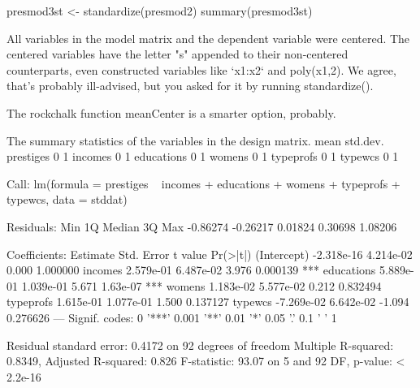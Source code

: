 \begin{Schunk}
\begin{Sinput}
 presmod3st <- standardize(presmod2)
 summary(presmod3st)
\end{Sinput}
\begin{Soutput}
All variables in the model matrix and the dependent variable
were centered. The centered variables have the letter "s" appended to their
non-centered counterparts, even constructed
variables like `x1:x2` and poly(x1,2). We agree, that's probably
ill-advised, but you asked for it by running standardize().

The rockchalk function meanCenter is a smarter option, probably. 

The summary statistics of the variables in the design matrix. 
           mean std.dev.
prestiges     0        1
incomes       0        1
educations    0        1
womens        0        1
typeprofs     0        1
typewcs       0        1

Call:
lm(formula = prestiges ~ incomes + educations + womens + typeprofs + 
    typewcs, data = stddat)

Residuals:
     Min       1Q   Median       3Q      Max 
-0.86274 -0.26217  0.01824  0.30698  1.08206 

Coefficients:
              Estimate Std. Error t value Pr(>|t|)    
(Intercept) -2.318e-16  4.214e-02   0.000 1.000000    
incomes      2.579e-01  6.487e-02   3.976 0.000139 ***
educations   5.889e-01  1.039e-01   5.671 1.63e-07 ***
womens       1.183e-02  5.577e-02   0.212 0.832494    
typeprofs    1.615e-01  1.077e-01   1.500 0.137127    
typewcs     -7.269e-02  6.642e-02  -1.094 0.276626    
---
Signif. codes:  0 '***' 0.001 '**' 0.01 '*' 0.05 '.' 0.1 ' ' 1

Residual standard error: 0.4172 on 92 degrees of freedom
Multiple R-squared:  0.8349,	Adjusted R-squared:  0.826 
F-statistic: 93.07 on 5 and 92 DF,  p-value: < 2.2e-16
\end{Soutput}
\end{Schunk}

